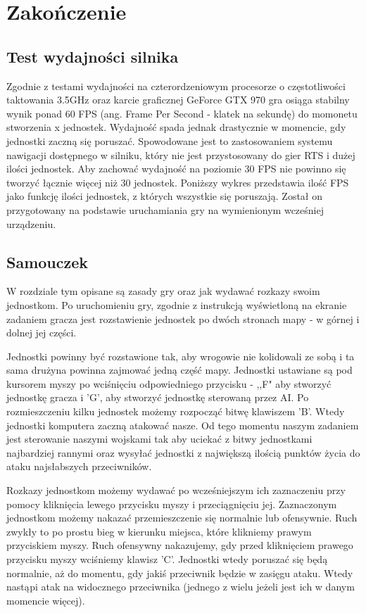 \documentclass[12pt]{report}
\begin{document}
\chapter{Zakończenie}
\section{Test wydajności silnika}

Zgodnie z testami wydajności na czterordzeniowym procesorze o częstotliwości taktowania 3.5GHz oraz karcie graficznej GeForce GTX 970 gra osiąga stabilny wynik ponad 60 FPS (ang. Frame Per Second - klatek na sekundę) do momonetu stworzenia x jednostek. Wydajność spada jednak drastycznie w momencie, gdy jednostki zaczną się poruszać. Spowodowane jest to zastosowaniem systemu nawigacji dostępnego w silniku, który nie jest przystosowany do gier RTS i dużej ilości jednostek. Aby zachować wydajność na poziomie 30 FPS nie powinno się tworzyć łącznie więcej niż 30 jednostek. Poniższy wykres przedstawia ilość FPS jako funkcję ilości jednostek, z których wszystkie się poruszają. Został on przygotowany na podstawie uruchamiania gry na wymienionym wcześniej urządzeniu. 

\section{Samouczek }
W rozdziale tym opisane są zasady gry oraz jak wydawać rozkazy swoim jednostkom.
Po uruchomieniu gry, zgodnie z instrukcją wyświetloną na ekranie zadaniem gracza jest rozstawienie jednostek po dwóch stronach mapy - w górnej i dolnej jej części. 

Jednostki powinny być rozstawione tak, aby wrogowie nie kolidowali ze sobą i ta sama drużyna powinna zajmować jedną część mapy. Jednostki ustawiane są pod kursorem myszy po wciśnięciu odpowiedniego przycisku - ,,F" aby stworzyć jednostkę gracza i 'G', aby stworzyć jednostkę sterowaną przez AI. Po rozmieszczeniu kilku jednostek możemy rozpocząć bitwę klawiszem 'B'. Wtedy jednostki komputera zaczną atakować nasze. Od tego momentu naszym zadaniem jest sterowanie naszymi wojskami tak aby uciekać z bitwy jednostkami najbardziej rannymi oraz wysyłać jednostki z największą ilością punktów życia do ataku najsłabszych przeciwników.

Rozkazy jednostkom możemy wydawać po wcześniejszym ich zaznaczeniu przy pomocy kliknięcia lewego przycisku myszy i przeciągnięciu jej. Zaznaczonym jednostkom możemy nakazać przemieszczenie się normalnie lub ofensywnie. Ruch zwykły to po prostu bieg w kierunku miejsca, które klikniemy prawym przyciskiem myszy. Ruch ofensywny nakazujemy, gdy przed kliknięciem prawego przycisku myszy wciśniemy klawisz 'C'. Jednostki wtedy poruszać się będą normalnie, aż do momentu, gdy jakiś przeciwnik będzie w zasięgu ataku. Wtedy nastąpi atak na widocznego przeciwnika (jednego z wielu jeżeli jest ich w danym momencie więcej).
\end{document}

